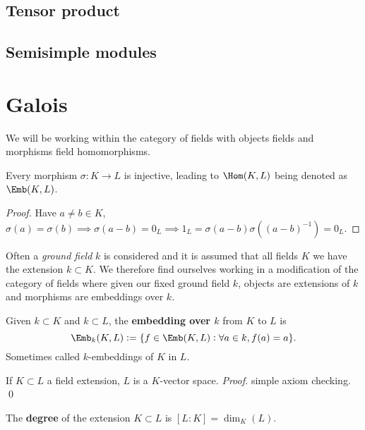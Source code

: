 \documentclass{report}
\begin{document}
\subsection{Tensor product}

\subsection{Semisimple modules}

\newpage

\section{Galois}
\setcounter{subsection}{1}

We will be working within the category of fields with objects fields and morphisms field homomorphisms.

\begin{remark}
    Every morphism $\sigma:K\rightarrow L$ is injective, leading to $\Hom(K,L)$ being denoted as $\Emb(K,L)$.\begin{proof}
        Have $a\neq b\in K$, $\sigma(a)=\sigma(b)\implies\sigma(a-b)=0_L\implies 1_L=\sigma(a-b)\sigma({(a-b)}^{-1})=0_L$.\cont
    \end{proof}
    
\end{remark}

Often a \textit{ground field} $k$ is considered and it is assumed that all fields $K$ we have the extension $k\subset K$. We therefore find ourselves working in a modification of the category of fields where given our fixed ground field $k$, objects are extensions of $k$ and morphisms are embeddings over $k$.

\begin{definition}
    Given $k\subset K$ and $k\subset L$, the \textbf{embedding over $k$} from $K$ to $L$ is \[
        \Emb_k(K,L):=\{f\in\Emb(K,L):\forall a\in k, f(a)=a\} \black{.} \]
    Sometimes called $k$-embeddings of $K$ in $L$.
\end{definition}

\begin{remark}
    If $K\subset L$ a field extension, $L$ is a $K$-vector space. \textit{Proof.} simple axiom checking. \qed
\end{remark}

\begin{definition}[Degree]
    The \textbf{degree} of the extension $K\subset L$ is $[L:K]=\dim_K(L)$.
\end{definition}
\end{document}

